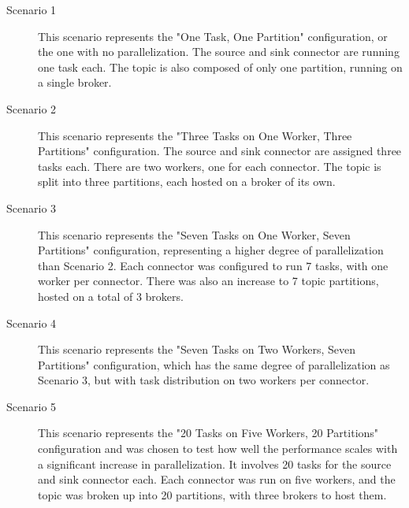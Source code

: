 \begin{description}
    \item [Scenario 1]
    This scenario represents the "One Task, One Partition" configuration, or the one with no parallelization. The source and sink connector are running one task each. The topic is also composed of only one partition, running on a single broker.

    \item[Scenario 2]
    This scenario represents the "Three Tasks on One Worker, Three Partitions" configuration. The source and sink connector are assigned three tasks each. There are two workers, one for each connector. The topic is split into three partitions, each hosted on a broker of its own.

    \item[Scenario 3]
    This scenario represents the "Seven Tasks on One Worker, Seven Partitions" configuration, representing a higher degree of parallelization than Scenario 2. Each connector was configured to run 7 tasks, with one worker per connector. There was also an increase to 7 topic partitions, hosted on a total of 3 brokers.

    \item[Scenario 4]
    This scenario represents the "Seven Tasks on Two Workers, Seven Partitions" configuration, which has the same degree of parallelization as Scenario 3, but with task distribution on two workers per connector.
    
    \item[Scenario 5]
    This scenario represents the "20 Tasks on Five Workers, 20 Partitions" configuration and was chosen to test how well the performance scales with a significant increase in parallelization. It involves 20 tasks for the source and sink connector each. Each connector was run on five workers, and the topic was broken up into 20 partitions, with three brokers to host them.
\end{description}

